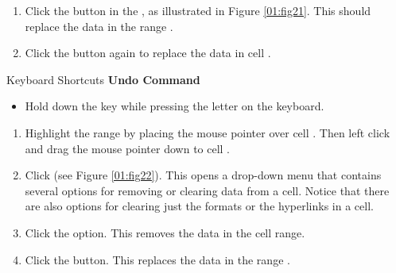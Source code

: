 \begin{enumerate}
	\item Click the  button in the , as illustrated in Figure \ref{01:fig21}. This should replace the data in the range .
	\item Click the  button again to replace the data in cell .
\end{enumerate}

\begin{center}
	\begin{shtcutbox}{Keyboard Shortcuts}
		\textbf{Undo Command}
		\\
		\begin{itemize}
			\setlength{\itemsep}{0pt}
			\setlength{\parskip}{0pt}
			\setlength{\parsep}{0pt}
			
			\item Hold down the  key while pressing the letter  on the keyboard.
			
		\end{itemize}
	\end{shtcutbox}
\end{center}

\begin{enumerate}[resume]
	\item Highlight the range  by placing the mouse pointer over cell . Then left click and drag the mouse pointer down to cell .
	\item Click  (see Figure \ref{01:fig22}). This opens a drop-down menu that contains several options for removing or clearing data from a cell. Notice that there are also options for clearing just the formats or the hyperlinks in a cell.
	\item Click the  option. This removes the data in the cell range.
	\item Click the  button. This replaces the data in the range .
\end{enumerate}

